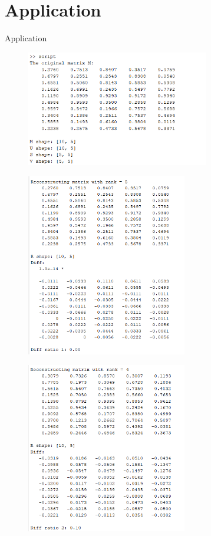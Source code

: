\documentclass[aspectratio=169,xcolor=dvipsnames]{beamer}
\begin{document}
\section{Application}
\begin{frame}{Application}
   \begin{figure}[h]
\includegraphics[width=8cm]{images/result1.png}
\end{figure}
\end{frame}

\begin{frame}
   \begin{figure}[h]
\includegraphics[width=7cm]{images/result2.png}
\end{figure}
\end{frame}

\begin{frame}
   \begin{figure}[h]
\includegraphics[width=7cm]{images/result3.png}
\end{figure}
\end{frame}
\end{document}
